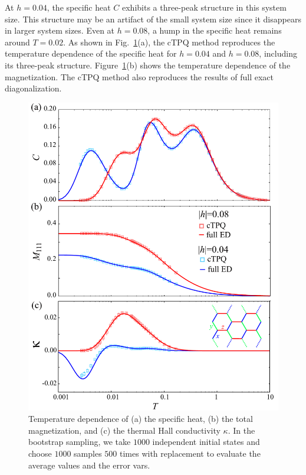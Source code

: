 \documentclass[twocolumn,superscriptaddress,showpacs, longbibliography, aps, prb]{revtex4-2}
\begin{document}
At $h=0.04$, the specific heat $C$ exhibits a three-peak structure in this system size.
This structure may be an artifact of the small system size 
since it %
disappears %
in larger system sizes.
Even at $h=0.08$, %
a hump in the specific heat %
remains around $T=0.02$.
As shown in Fig.~\ref{comp_ED}(a),
the cTPQ method reproduces the temperature dependence 
of the specific heat for $h=0.04$ and $h=0.08$, including
its three-peak structure.
Figure~\ref{comp_ED}(b) shows the temperature dependence of the magnetization.
The cTPQ method also reproduces the results of full exact diagonalization. 

\begin{figure}[t] 
\begin{center} 
\includegraphics[width=0.9\linewidth]{Figs/compED_4_o.pdf}
\vspace{-0.5cm} 
\caption{Temperature dependence of (a) the specific heat, (b) the total magnetization, and
(c) the thermal Hall conductivity $\kappa$.
In the bootstrap sampling, we take $1000$ independent initial states and choose $1000$ samples $500$ times with replacement to evaluate
the average values and the error vars.
}
\label{comp_ED}
\end{center}
\end{figure}
\end{document}
